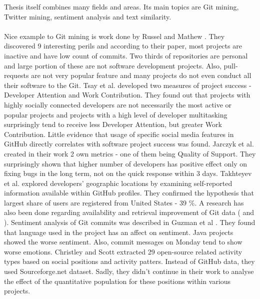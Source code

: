 Thesis itself combines many fields and areas. Its main topics are Git mining, Twitter mining, sentiment analysis and text similarity.\\
\\
Nice example to Git mining is work done by Russel and Mathew \cite{russell2013mining}. They discovered 9 interesting perils and according to their paper, most projects are inactive and have low count of commits. Two thirds of repositories are personal and large portion of these are not software development projects. Also, pull-requests are not very popular feature and many projects do not even conduct all their software to the Git. Tsay et al. \cite{tsay2012social} developed two measures of project success - Developer Attention and Work Contribution. They found out that projects with highly socially connected developers are not necessarily the most active or popular projects and projects with a high level of developer multitasking surprisingly tend to receive less Developer Attention, but greater Work Contribution. Little evidence that usage of specific social media features in GitHub directly correlates with software project success was found.  Jarczyk et al. \cite{jarczyk2014github} created in their work 2 own metrics - one of them being Quality of Support. They surprisingly shown that higher number of developers has positive effect only on fixing bugs in the long term, not on the quick response within 3 days. Takhteyev et al. \cite{takhteyev2010investigating} explored developers' geographic locations by examining self-reported information available within GitHub profiles. They confirmed the hypothesis that largest share of users are registered from United States - 39 \%. A research has also been done regarding availability and retrieval improvement of Git data (\cite{wagstrom2013network} and \cite{gousios2012ghtorrent}). Sentiment analysis of Git commits was described in Guzman et al \cite{guzman2014sentiment}. They found that language used in the project has an affect on sentiment. Java projects showed the worse sentiment. Also, commit messages on Monday tend to show worse emotions. Christley and Scott \cite{christley2007analysis} extracted 29 open-source related activity types
based on social positions and activity patters. Instead of GitHub data, they used Sourceforge.net
dataset. Sadly, they didn’t continue in their work to analyse the effect of the quantitative population for these positions within various projects.\\
\\
